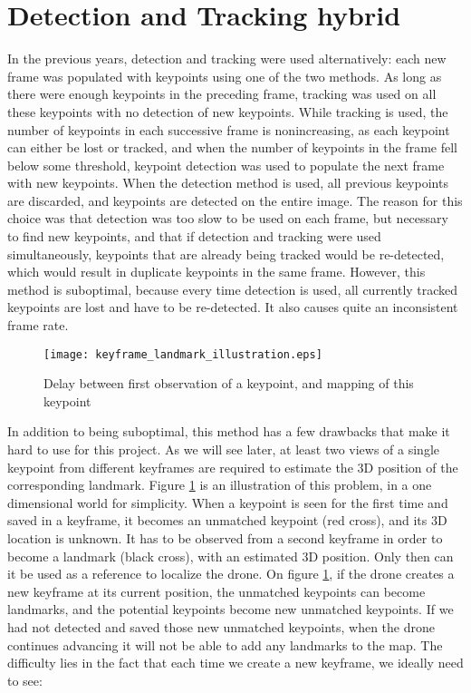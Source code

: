 \section{Detection and Tracking hybrid}

In the previous years, detection and tracking were used alternatively: each new frame was populated with keypoints using one of the two methods. As long as there were enough keypoints in the preceding frame, tracking was used on all these keypoints with no detection of new keypoints. While tracking is used, the number of keypoints in each successive frame is nonincreasing, as each keypoint can either be lost or tracked, and when the number of keypoints in the frame fell below some threshold, keypoint detection was used to populate the next frame with new keypoints. When the detection method is used, all previous keypoints are discarded, and keypoints are detected on the entire image. The reason for this choice was that detection was too slow to be used on each frame, but necessary to find new keypoints, and that if detection and tracking were used simultaneously, keypoints that are already being tracked would be re-detected, which would result in duplicate keypoints in the same frame. However, this method is suboptimal, because every time detection is used, all currently tracked keypoints are lost and have to be re-detected. It also causes quite an inconsistent frame rate.\\

\begin{figure}[H]
  \centering
  \texttt{[image: keyframe\_landmark\_illustration.eps]}
  \caption{Delay between first observation of a keypoint, and mapping of this keypoint}
  \label{fig:delay}
\end{figure}

In addition to being suboptimal, this method has a few drawbacks that make it hard to use for this project. As we will see later, at least two views of a single keypoint from different keyframes are required to estimate the 3D position of the corresponding landmark. Figure \ref{fig:delay} is an illustration of this problem, in a one dimensional world for simplicity. When a keypoint is seen for the first time and saved in a keyframe, it becomes an unmatched keypoint (red cross), and its 3D location is unknown. It has to be observed from a second keyframe in order to become a landmark (black cross), with an estimated 3D position. Only then can it be used as a reference to localize the drone. On figure \ref{fig:delay}, if the drone creates a new keyframe at its current position, the unmatched keypoints can become landmarks, and the potential keypoints become new unmatched keypoints. If we had not detected and saved those new unmatched keypoints, when the drone continues advancing it will not be able to add any landmarks to the map. The difficulty lies in the fact that each time we create a new keyframe, we ideally need to see:

